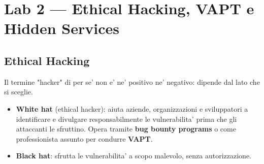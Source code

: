 \section{Lab 2 — Ethical Hacking, VAPT e Hidden Services}

\subsection{Ethical Hacking}
Il termine "hacker" di per se' non e' ne' positivo ne' negativo: dipende dal lato che si sceglie.
\begin{itemize}
  \item \textbf{White hat} (ethical hacker): aiuta aziende, organizzazioni e sviluppatori a identificare e divulgare responsabilmente le vulnerabilita' prima che gli attaccanti le sfruttino. Opera tramite \textbf{bug bounty programs} o come professionista assunto per condurre \textbf{VAPT}.
  \item \textbf{Black hat}: sfrutta le vulnerabilita' a scopo malevolo, senza autorizzazione.
\end{itemize}

